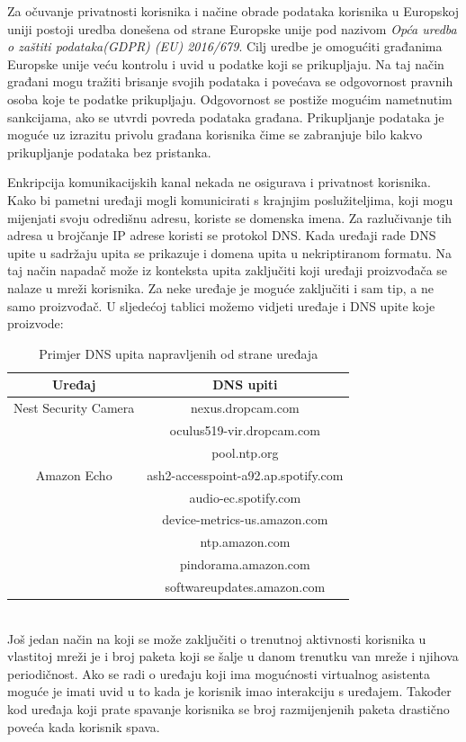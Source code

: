 \documentclass[times, utf8, diplomski]{fer}
\begin{document}
Za očuvanje privatnosti korisnika i načine obrade podataka korisnika u Europskoj uniji postoji uredba donešena od strane Europske unije pod nazivom \emph{Opća uredba o zaštiti podataka(GDPR) (EU) 2016/679}\citep{GDPR}. Cilj uredbe je omogućiti građanima Europske unije veću kontrolu i uvid u podatke koji se prikupljaju. Na taj način građani mogu tražiti brisanje svojih podataka i povećava se odgovornost pravnih osoba koje te podatke prikupljaju. Odgovornost se postiže mogućim nametnutim sankcijama, ako se utvrdi povreda podataka građana. Prikupljanje podataka je moguće uz izrazitu privolu građana korisnika čime se zabranjuje bilo kakvo prikupljanje podataka bez pristanka. 

Enkripcija komunikacijskih kanal nekada ne osigurava i privatnost korisnika. Kako bi pametni uređaji mogli komunicirati s krajnjim poslužiteljima, koji mogu mijenjati svoju odredišnu adresu, koriste se domenska imena. Za razlučivanje tih adresa u brojčanje IP adrese koristi se protokol DNS. Kada uređaji rade DNS upite u sadržaju upita se prikazuje i domena upita u nekriptiranom formatu. Na taj način napadač može iz konteksta upita zaključiti koji uređaji proizvođača se nalaze u mreži korisnika. Za neke uređaje je moguće zaključiti i sam tip, a ne samo proizvođač. U sljedećoj tablici možemo vidjeti uređaje i DNS upite koje proizvode:
\begin{table}[h]
    \centering
    \begin{tabular}{| c | c |} 
    \hline
    \textbf{Uređaj} & \textbf{DNS upiti} \\
    \hline\hline
    Nest Security Camera & nexus.dropcam.com \\
     & oculus519-vir.dropcam.com \\
     & pool.ntp.org \\
    \hline
    Amazon Echo & ash2-accesspoint-a92.ap.spotify.com \\ 
     & audio-ec.spotify.com \\ 
     & device-metrics-us.amazon.com \\ 
     & ntp.amazon.com \\ 
     & pindorama.amazon.com \\ 
     & softwareupdates.amazon.com \\
    \hline
    \end{tabular}
    \caption{Primjer DNS upita napravljenih od strane uređaja \citep{Apthorpe2017May}}
    \label{tab:confusion}
\end{table} \\
Još jedan način na koji se može zaključiti o trenutnoj aktivnosti korisnika u vlastitoj mreži je i broj paketa koji se šalje u danom trenutku van mreže i njihova periodičnost. Ako se radi o uređaju koji ima mogućnosti virtualnog asistenta moguće je imati uvid u to kada je korisnik imao interakciju s uređajem. Također kod uređaja koji prate spavanje korisnika se broj razmijenjenih paketa drastično poveća kada korisnik spava.\citep{Apthorpe2017May}
\end{document}
